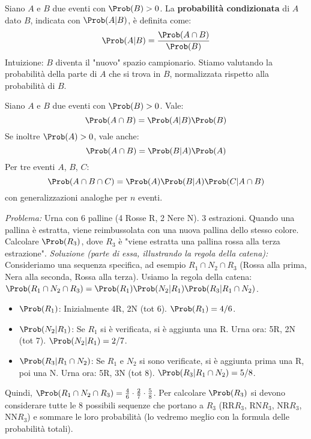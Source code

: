 \begin{definition}
Siano $A$ e $B$ due eventi con $\Prob(B) > 0$. La \textbf{probabilità condizionata} di $A$ dato $B$, indicata con $\Prob(A|B)$, è definita come:
\[ \Prob(A|B) = \frac{\Prob(A \cap B)}{\Prob(B)} \]
Intuizione: $B$ diventa il "nuovo" spazio campionario. Stiamo valutando la probabilità della parte di $A$ che si trova in $B$, normalizzata rispetto alla probabilità di $B$.
\end{definition}

\begin{corollary}\label{cor:catena}
Siano $A$ e $B$ due eventi con $\Prob(B) > 0$. Vale:
\[ \Prob(A \cap B) = \Prob(A|B) \Prob(B) \]
Se inoltre $\Prob(A) > 0$, vale anche:
\[ \Prob(A \cap B) = \Prob(B|A) \Prob(A) \]
Per tre eventi $A$, $B$, $C$:
\[ \Prob(A \cap B \cap C) = \Prob(A) \Prob(B|A) \Prob(C|A \cap B) \]
con generalizzazioni analoghe per $n$ eventi.
\end{corollary}

\begin{example}
\textit{Problema:} Urna con 6 palline (4 Rosse R, 2 Nere N). 3 estrazioni. Quando una pallina è estratta, viene reimbussolata con una nuova pallina dello stesso colore. Calcolare $\Prob(R_3)$, dove $R_3$ è "viene estratta una pallina rossa alla terza estrazione".
\textit{Soluzione (parte di essa, illustrando la regola della catena):}
Consideriamo una sequenza specifica, ad esempio $R_1 \cap N_2 \cap R_3$ (Rossa alla prima, Nera alla seconda, Rossa alla terza).
Usiamo la regola della catena: $\Prob(R_1 \cap N_2 \cap R_3) = \Prob(R_1) \Prob(N_2|R_1) \Prob(R_3|R_1 \cap N_2)$.
\begin{itemize}
    \item $\Prob(R_1)$: Inizialmente 4R, 2N (tot 6). $\Prob(R_1) = 4/6$.
    \item $\Prob(N_2|R_1)$: Se $R_1$ si è verificata, si è aggiunta una R. Urna ora: 5R, 2N (tot 7). $\Prob(N_2|R_1) = 2/7$.
    \item $\Prob(R_3|R_1 \cap N_2)$: Se $R_1$ e $N_2$ si sono verificate, si è aggiunta prima una R, poi una N. Urna ora: 5R, 3N (tot 8). $\Prob(R_3|R_1 \cap N_2) = 5/8$.
\end{itemize}
Quindi, $\Prob(R_1 \cap N_2 \cap R_3) = \frac{4}{6} \cdot \frac{2}{7} \cdot \frac{5}{8}$.
Per calcolare $\Prob(R_3)$ si devono considerare tutte le 8 possibili sequenze che portano a $R_3$ (RR$R_3$, RN$R_3$, NR$R_3$, NN$R_3$) e sommare le loro probabilità (lo vedremo meglio con la formula delle probabilità totali).
\end{example}

